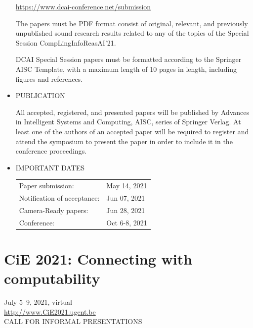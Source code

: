 \documentclass[prodmode,acmtecs]{acmsmall} %
\begin{document}
\begin{itemize}
  \href{https://www.dcai-conference.net/submission}{https://www.dcai-conference.net/submission} 
 
  The papers must be PDF format consist of original, relevant, and previously unpublished sound research results related to any of the topics of the Special Session CompLingInfoReasAI'21. 
 
  DCAI Special Session papers must be formatted according to the Springer AISC Template, with a maximum length of 10 pages in length, including figures and references.  
 
\item  PUBLICATION 
 
  All accepted, registered, and presented papers will be published by Advances in Intelligent Systems and Computing, AISC, series of Springer Verlag. At least one of the authors of an accepted paper will be required to register and attend the symposium to present the paper in order to include it in the conference proceedings. 
 
\item  IMPORTANT DATES 
 
\begin{tabulary}{\linewidth}{LL}Paper submission:  & May 14, 2021 \\
Notification of acceptance:  & Jun 07, 2021 \\
Camera-Ready papers:  & Jun 28, 2021 \\
Conference:  & Oct 6-8, 2021 \\
\end{tabulary}
 
\end{itemize}\section{CiE 2021: Connecting with computability}\label{CiE2021}  July 5–9, 2021, virtual\\ 
  \href{http://www.CiE2021.ugent.be}{http://www.CiE2021.ugent.be}\\ 
CALL FOR INFORMAL PRESENTATIONS 
\end{document}
